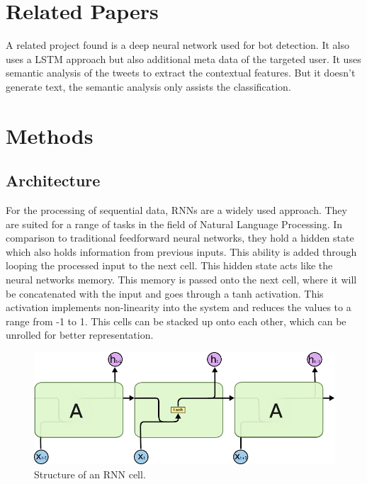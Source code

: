\documentclass[conference]{IEEEtran}
\begin{document}
\section{Related Papers}

A related project found is a deep neural network used for bot detection. It also uses a LSTM approach but also additional meta data of the targeted user. It uses semantic analysis of the tweets to extract the contextual features. But it doesn’t generate text, the semantic analysis only assists the classification.

\section{Methods}

\subsection{Architecture}

For the processing of sequential data, RNNs are a widely used approach. They are suited for a range of tasks in the field of Natural Language Processing. In comparison to traditional feedforward neural networks, they hold a hidden state which also holds information from previous inputs. This ability is added through looping the processed input to the next cell. This hidden state acts like the neural networks memory. This memory is passed onto the next cell, where it will be concatenated with the input and goes through a tanh activation. This activation implements non-linearity into the system and reduces the values to a range from -1 to 1. This cells can be stacked up onto each other, which can be unrolled for better representation. 

\begin{figure}[htbp]
\centerline{\includegraphics{pictures/structure_rnn.png}}
\caption{Structure of an RNN cell.}
\label{fig:structure_rnn}
\end{figure}
\end{document}
